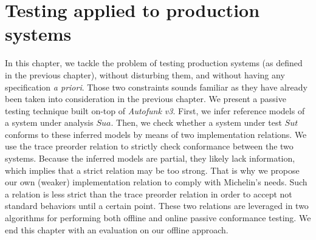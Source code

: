 %
\chapter{Testing applied to production systems}
\label{sec:testing}

In this chapter, we tackle the problem of testing production
systems (as defined in the previous chapter), without disturbing
them, and without having any specification \emph{a priori}. Those
two constraints sounds familiar as they have already been taken
into consideration in the previous chapter. We present a passive
testing technique built on-top of \emph{Autofunk v3}. First, we
infer reference models of a system under analysis $\mathit{Sua}$.
Then, we check whether a system under test $\mathit{Sut}$
conforms to these inferred models by means of two implementation
relations. We use the trace preorder relation to strictly check
conformance between the two systems. Because the inferred models
are partial, they likely lack information, which implies that a
strict relation may be too strong. That is why we propose our own
(weaker) implementation relation to comply with Michelin's needs.
Such a relation is less strict than the trace preorder relation
in order to accept not standard behaviors until a certain point.
These two relations are leveraged in two algorithms for
performing both offline and online passive conformance testing.
We end this chapter with an evaluation on our offline approach.\\

\minitoc

\pagebreak







\cleardoublepage
\blankpage

